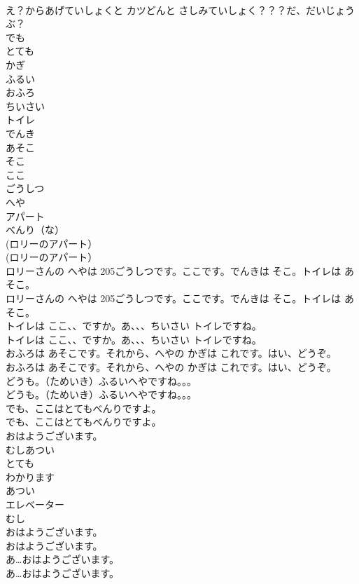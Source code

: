 \documentclass[8pt]{extreport}
\begin{document}
\begin{CJK}{UTF8}{min}
\\	え？からあげていしょくと カツどんと さしみていしょく？？？だ、だいじょうぶ？ 
\\	でも
\\	とても
\\	かぎ
\\	ふるい
\\	おふろ
\\	ちいさい
\\	トイレ
\\	でんき
\\	あそこ
\\	そこ
\\	ここ
\\	ごうしつ
\\	へや
\\	アパート
\\	べんり（な）
\\	(ロリーのアパート）	
\\	(ロリーのアパート） 
\\	ロリーさんの へやは 205ごうしつです。ここです。でんきは そこ。トイレは あそこ。	
\\	ロリーさんの へやは 205ごうしつです。ここです。でんきは そこ。トイレは あそこ。 
\\	トイレは ここ、、ですか。あ、、、ちいさい トイレですね。	
\\	トイレは ここ、、ですか。あ、、、ちいさい トイレですね。 
\\	おふろは あそこです。それから、へやの かぎは これです。はい、どうぞ。	
\\	おふろは あそこです。それから、へやの かぎは これです。はい、どうぞ。 
\\	どうも。（ためいき）ふるいへやですね。。。	
\\	どうも。（ためいき）ふるいへやですね。。。 
\\	でも、ここはとてもべんりですよ。	
\\	でも、ここはとてもべんりですよ。 
\\	おはようございます。
\\	むしあつい
\\	とても
\\	わかります
\\	あつい
\\	エレベーター
\\	むし
\\	おはようございます。	
\\	おはようございます。 
\\	あ…おはようございます。	
\\	あ…おはようございます。 

\end{CJK}
\end{document}
